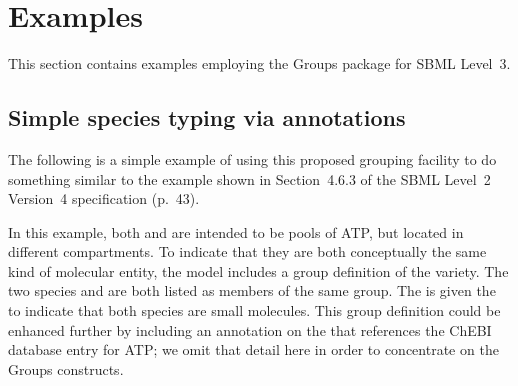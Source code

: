 
\section{Examples}
\label{examples}

This section contains examples employing the Groups package for SBML Level~3.

\subsection{Simple species typing via annotations}
\label{examples-speciestype}

The following is a simple example of using this proposed grouping facility to do something similar to the \SpeciesType example shown in Section~4.6.3 of the SBML Level~2 Version~4 specification (p.~43).

%


In this example, both  and  are intended to be pools of ATP, but located in different compartments.  To indicate that they are both conceptually the same kind of molecular entity, the model includes a group definition of the  variety.  The two species  and  are both listed as members of the same group.  The \ListOfMembers is given the   to indicate that both species are small molecules.
This group definition could be enhanced further by including an annotation on the \ListOfMembers that references the ChEBI database entry for ATP; we omit that detail here in order to concentrate on the Groups constructs.


